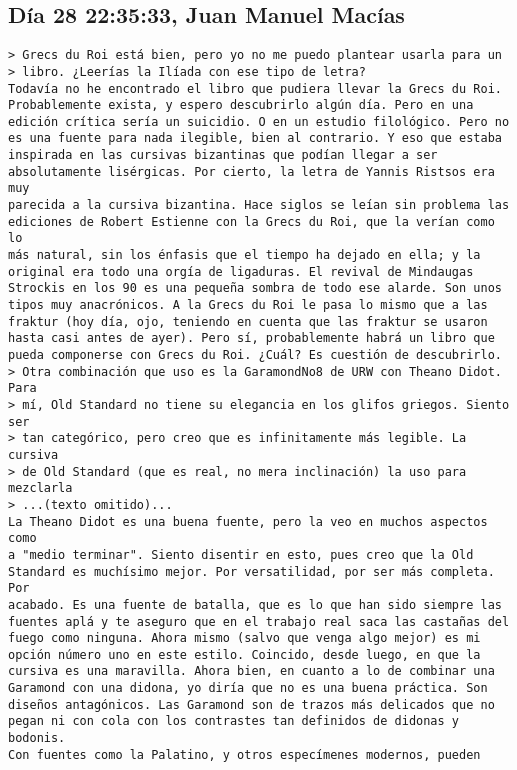 \documentclass[a4paper,10pt]{article}
\begin{document}
\subsection{Día 28 22:35:33, Juan Manuel Macías}

\begin{lstlisting}
> Grecs du Roi está bien, pero yo no me puedo plantear usarla para un
> libro. ¿Leerías la Ilíada con ese tipo de letra?
Todavía no he encontrado el libro que pudiera llevar la Grecs du Roi. 
Probablemente exista, y espero descubrirlo algún día. Pero en una 
edición crítica sería un suicidio. O en un estudio filológico. Pero no 
es una fuente para nada ilegible, bien al contrario. Y eso que estaba 
inspirada en las cursivas bizantinas que podían llegar a ser 
absolutamente lisérgicas. Por cierto, la letra de Yannis Ristsos era muy 
parecida a la cursiva bizantina. Hace siglos se leían sin problema las 
ediciones de Robert Estienne con la Grecs du Roi, que la verían como lo 
más natural, sin los énfasis que el tiempo ha dejado en ella; y la 
original era todo una orgía de ligaduras. El revival de Mindaugas 
Strockis en los 90 es una pequeña sombra de todo ese alarde. Son unos 
tipos muy anacrónicos. A la Grecs du Roi le pasa lo mismo que a las 
fraktur (hoy día, ojo, teniendo en cuenta que las fraktur se usaron 
hasta casi antes de ayer). Pero sí, probablemente habrá un libro que 
pueda componerse con Grecs du Roi. ¿Cuál? Es cuestión de descubrirlo.
> Otra combinación que uso es la GaramondNo8 de URW con Theano Didot. Para
> mí, Old Standard no tiene su elegancia en los glifos griegos. Siento ser
> tan categórico, pero creo que es infinitamente más legible. La cursiva
> de Old Standard (que es real, no mera inclinación) la uso para mezclarla
> ...(texto omitido)...
La Theano Didot es una buena fuente, pero la veo en muchos aspectos como 
a "medio terminar". Siento disentir en esto, pues creo que la Old 
Standard es muchísimo mejor. Por versatilidad, por ser más completa. Por 
acabado. Es una fuente de batalla, que es lo que han sido siempre las 
fuentes aplá y te aseguro que en el trabajo real saca las castañas del 
fuego como ninguna. Ahora mismo (salvo que venga algo mejor) es mi 
opción número uno en este estilo. Coincido, desde luego, en que la 
cursiva es una maravilla. Ahora bien, en cuanto a lo de combinar una 
Garamond con una didona, yo diría que no es una buena práctica. Son 
diseños antagónicos. Las Garamond son de trazos más delicados que no 
pegan ni con cola con los contrastes tan definidos de didonas y bodonis. 
Con fuentes como la Palatino, y otros especímenes modernos, pueden 

\end{lstlisting}
\end{document}
